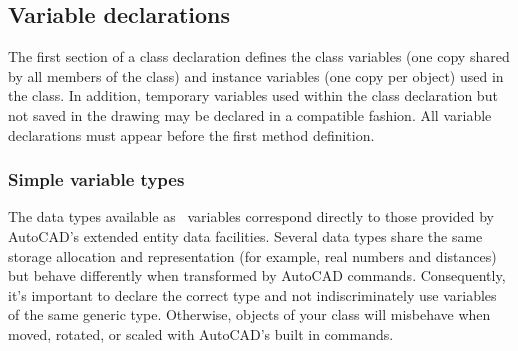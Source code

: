 \documentclass{article}
\begin{document}
\subsection{Variable declarations}

The first section of a class declaration defines the class variables
(one copy shared by all members of the class) and instance variables
(one copy per object) used in the class.  In addition, temporary
variables used within the class declaration but not saved in the
drawing may be declared in a compatible fashion.  All variable
declarations must appear before the first method definition.

\subsubsection{Simple variable types}

The data types available as \cw\ variables correspond directly to
those provided by AutoCAD's extended entity data facilities.  Several
data types share the same storage allocation and representation (for
example, real numbers and distances) but behave differently when
transformed by AutoCAD commands.  Consequently, it's important to
declare the correct type and not indiscriminately use variables of
the same generic type.  Otherwise, objects of your class will
misbehave when moved, rotated, or scaled with AutoCAD's built in
commands.
\end{document}
